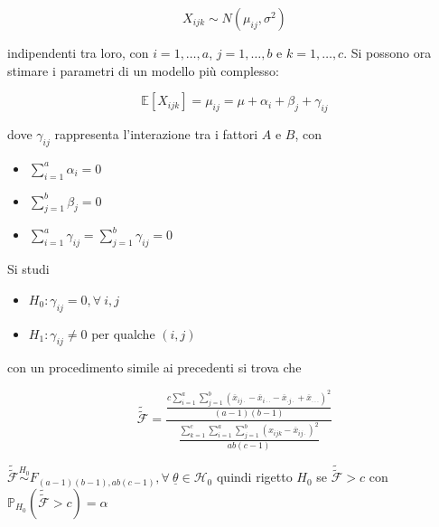 \documentclass[hidelinks, 10pt]{article}
\begin{document}
\[ X_{ijk} \sim N(\mu_{ij}, \sigma^{2}) \]

indipendenti tra loro, con $ i = 1, \dotsc, a $, $ j = 1, \dotsc, b $ e $ k = 1, \dotsc, c $. Si possono ora stimare i parametri di un modello pi\`u complesso:

\[ \mathbb{E}[X_{ijk}] = \mu_{ij} = \mu + \alpha_{i} + \beta_{j} + \gamma_{ij} \]

dove $ \gamma_{ij} $ rappresenta l'interazione tra i fattori $ A $ e $ B $, con
\begin{itemize}
\item $ \sum\limits_{i = 1}^{a} \alpha_{i} = 0 $
\item $ \sum\limits_{j = 1}^{b} \beta_{j} = 0 $
\item $ \sum\limits_{i = 1}^{a} \gamma_{ij} = \sum\limits_{j = 1}^{b} \gamma_{ij} = 0 $
\end{itemize}

Si studi
\begin{itemize}
\item $ H_{0}: \gamma_{ij} = 0, \forall\ i, j $
\item $ H_{1}: \gamma_{ij} \ne 0 $ per qualche $ (i, j) $
\end{itemize}

con un procedimento simile ai precedenti si trova che

\[ \tilde{\tilde{\mathcal{F}}} = \frac{\frac{c \sum\limits_{i = 1}^{a} \sum\limits_{j = 1}^{b} (\overline{x}_{i j \cdot} - \overline{x}_{i \cdot \cdot} - \overline{x}_{\cdot j \cdot} + \overline{x}_{\cdot \cdot \cdot})^{2}}{(a - 1)(b - 1)}}{\frac{\sum\limits_{k = 1}^{c} \sum\limits_{i = 1}^{a} \sum\limits_{j = 1}^{b} (x_{ijk} - \overline{x}_{i j \cdot})^{2}}{ab (c - 1)}} \]

$ \tilde{\tilde{\mathcal{F}}} \stackrel{H_{0}}{\sim} F_{(a - 1)(b - 1), ab(c - 1)}, \forall\ \underline{\theta} \in \mathcal{H}_{0} $ quindi rigetto $ H_{0} $ se $ \tilde{\tilde{\mathcal{F}}} > c $ con $ \mathbb{P}_{H_{0}} (\tilde{\tilde{\mathcal{F}}} > c) = \alpha $ 
\end{document}
